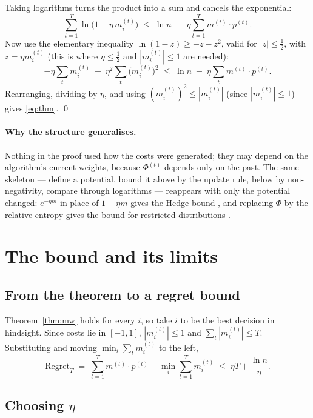 \documentclass[11pt,a4paper]{article}
\theoremstyle{plain}
\theoremstyle{definition}
\newcommand{\regret}{\mathrm{Regret}}
\begin{document}
Taking logarithms turns the product into a sum and cancels the exponential:
\[
\sum_{t=1}^{T} \ln\bigl(1-\eta\, m^{(t)}_i\bigr) \;\le\; \ln n \;-\; \eta \sum_{t=1}^{T} m^{(t)}\cdot p^{(t)} .
\]
Now use the elementary inequality $\ln(1-z) \ge -z - z^2$, valid for $|z| \le \frac12$, with $z = \eta m^{(t)}_i$ (this is where $\eta \le \frac12$ and $|m^{(t)}_i| \le 1$ are needed):
\[
-\eta\sum_t m^{(t)}_i \;-\; \eta^2 \sum_t \bigl(m^{(t)}_i\bigr)^2 \;\le\; \ln n \;-\; \eta \sum_t m^{(t)}\cdot p^{(t)} .
\]
Rearranging, dividing by $\eta$, and using $(m^{(t)}_i)^2 \le |m^{(t)}_i|$ (since $|m^{(t)}_i| \le 1$) gives \eqref{eq:thm}. \qed

\paragraph{Why the structure generalises.}
Nothing in the proof used how the costs were generated; they may depend on the algorithm's current weights, because $\Phi^{(t)}$ depends only on the past. The same skeleton --- define a potential, bound it above by the update rule, below by non-negativity, compare through logarithms --- reappears with only the potential changed: $e^{-\eta m}$ in place of $1-\eta m$ gives the Hedge bound \cite[Section~2.2]{AHK12}, and replacing $\Phi$ by the relative entropy gives the bound for restricted distributions \cite[Section~2.3]{AHK12}.

\clearpage
\section{The bound and its limits}
\label{sec:bound}

\subsection{From the theorem to a regret bound}

Theorem~\ref{thm:mw} holds for every $i$, so take $i$ to be the best decision in hindsight. Since costs lie in $[-1,1]$, $|m^{(t)}_i| \le 1$ and $\sum_t |m^{(t)}_i| \le T$. Substituting and moving $\min_i \sum_t m^{(t)}_i$ to the left,
\begin{equation}
\label{eq:regretbound}
\regret_T \;=\; \sum_{t=1}^{T} m^{(t)}\cdot p^{(t)} - \min_i \sum_{t=1}^{T} m^{(t)}_i \;\le\; \eta T + \frac{\ln n}{\eta}.
\end{equation}

\subsection{Choosing \texorpdfstring{$\eta$}{eta}}
\end{document}
